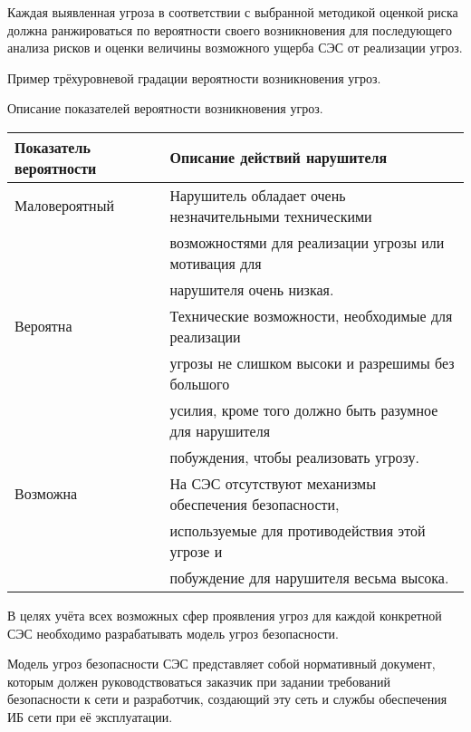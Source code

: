 \documentclass[12pt, russian, oneside, article]{ncc}
\begin{document}
Каждая выявленная угроза в соответствии с выбранной методикой оценкой риска должна ранжироваться по вероятности своего возникновения для последующего анализа рисков и оценки величины возможного ущерба СЭС от реализации угроз.

Пример трёхуровневой градации вероятности возникновения угроз.

Описание показателей вероятности возникновения угроз.


\begin{center}
\begin{tabular}{ll}
 Показатель вероятности  &  Описание действий нарушителя                            \\
\hline
 Маловероятный           &  Нарушитель обладает очень незначительными техническими  \\
                         &  возможностями для реализации угрозы или мотивация для   \\
                         &  нарушителя очень низкая.                                \\
\hline
 Вероятна                &  Технические возможности, необходимые для реализации     \\
                         &  угрозы не слишком высоки и разрешимы без большого       \\
                         &  усилия, кроме того должно быть разумное для нарушителя  \\
                         &  побуждения, чтобы реализовать угрозу.                   \\
\hline
 Возможна                &  На СЭС отсутствуют механизмы обеспечения безопасности,  \\
                         &  используемые для противодействия этой угрозе и          \\
                         &  побуждение для нарушителя весьма высока.                \\
\end{tabular}
\end{center}



В целях учёта всех возможных сфер проявления угроз для каждой конкретной СЭС необходимо разрабатывать модель угроз безопасности.

Модель угроз безопасности СЭС представляет собой нормативный документ, которым должен руководствоваться заказчик при задании требований безопасности к сети и разработчик, создающий эту сеть и службы обеспечения ИБ сети при её эксплуатации.
\end{document}
